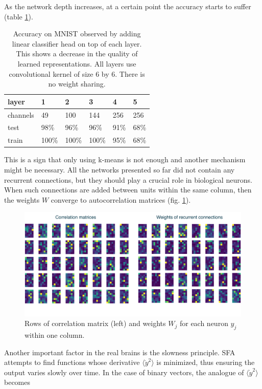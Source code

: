 \documentclass[12pt]{article}
\begin{document}
As the network depth increases, at a certain point the accuracy starts to suffer (table \ref{table:ecc_accuracy}).
\begin{table}[]
	\begin{tabular}{|llllll|}
		\hline
		layer    & 1     & 2     & 3     & 4    & 5    \\ \hline
		channels & 49    & 100   & 144   & 256  & 256  \\ 
		test    & 98\%  & 96\%  & 96\%  & 91\% & 68\% \\ 
		train     & 100\% & 100\% & 100\% & 95\% & 68\% \\ \hline
	\end{tabular}
	\caption{Accuracy on MNIST observed by adding linear classifier head on top of each layer. This shows a decrease in the quality of learned representations. All layers use convolutional kernel of size 6 by 6. There is no weight sharing.}
	\label{table:ecc_accuracy}
\end{table}
This is a sign that only using k-means is not enough and another mechanism might be necessary. All the networks presented so far did not contain any recurrent connections, but they should play a crucial role in biological neurons. When such connections are added between units within the same column, then the weights $W$ converge to autocorrelation matrices (fig. \ref{fig:recurrent_connections}).
\begin{figure}[!htbp]
	\centering
	\includegraphics[width=13.5cm]{recurrent_connections}
	\caption{Rows of correlation matrix (left) and weights $W_j$ for each neuron $y_j$ within one column.}
	\label{fig:recurrent_connections}
\end{figure} 
Another important factor in the real brains is the slowness principle. SFA attempts to find functions whose derivative $\langle \dot{y}^2 \rangle$ is minimized, thus ensuring the output varies slowly over time.
In the case of binary vectors, the analogue of $\langle \dot{y}^2 \rangle$   becomes
\end{document}
